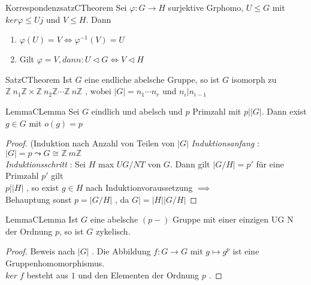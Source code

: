 \documentclass[a4paper]{memoir}
\begin{document}
\pagecolor{White}
\color{Black}
\begin{ibox}[5.2]{Korrespondenzsatz}{CTheorem}
    Sei $ \varphi : G \to H $ surjektive Grphomo, $ U \leq G $ mit $ ker
	\varphi \leq  U j $ und $ V \leq  H $. Dann 
	\begin{enumerate}[label=\alph*)]
		\item $ \varphi (U) = V \iff \varphi^{-1}(V) = U $ 
		\item Gilt $ \varphi = V, dann: U \triangleleft G \iff V 
			\triangleleft H
 $ 	\end{enumerate}
	
\end{ibox}


\begin{ibox}[5.1]{Satz}{CTheorem}
    Ist $ G $ eine endliche abelsche Gruppe, so ist $ G $ isomorph zu 
	$ \mathbb{Z} \ n_1 \mathbb{Z} \times \mathbb{Z}  \ n_2 \mathbb{Z} 
	\cdots \mathbb{Z} \ n \mathbb{Z} \text{ , wobei  } \left| G \right| 
	= n_1 \cdots n_{r}$  und $ n_{i}| n_{i-1} $  
\end{ibox}
\begin{ibox}[5.3]{Lemma}{CLemma}
    Sei $ G $ eindlich und abelsch und $ p $ Primzahl mit $ p | 
	\left| G \right| $. Dann exist $ g \in G $ mit $ o(g) = p $ 
\end{ibox}

\begin{proof}
	(Induktion nach Anzahl von Teilen von $ \left| G \right|  $ 
	\textit{Induktionsanfang} : $ \left| G \right|  = p \leadsto G \cong
	\mathbb{Z} \ m \mathbb{Z} $\\
	\textit{Induktionsschritt} : Sei $ H $ max $ UG/NT $ von $ G $. Dann
	gilt $ \left| G/H \right|  = p' $ für eine Primzahl $ p' $ 
	gilt \\ $ p | \left| H \right|  $ , so exist $ g \in  H $ nach 
	Induktionvoraussetzung $ \implies $ \\ Behauptung 
	sonst $  p = \left| G/H \right|  $ , da $ G| = |H| 
	\left| G/H \right|  $ 


\end{proof}

\begin{ibox}[4.5]{Lemma}{CLemma}
    Ist $ G $ eine abelsche $ (p-) $ Gruppe mit einer einzigen UG N der 
	Ordnung $ p $, so ist $ G $ zykelisch. 
\end{ibox}

\begin{proof}
	Beweis nach $ \left| G \right|  $ . Die Abbildung $ f : G \to G $ 
	mit $ g \mapsto g^{p} $ ist eine Gruppenhomomorphismus. \\
	$ ker \; f $ besteht aus $ 1 $ und den Elementen der Ordnung $ p $ .
\end{proof}
\end{document}
